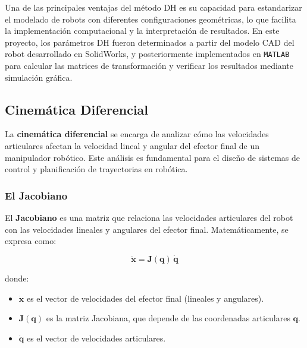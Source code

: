 Una de las principales ventajas del método DH es su capacidad para estandarizar el modelado de robots con diferentes configuraciones geométricas, lo que facilita la implementación computacional y la interpretación de resultados. En este proyecto, los parámetros DH fueron determinados a partir del modelo CAD del robot desarrollado en SolidWorks, y posteriormente implementados en \texttt{MATLAB} para calcular las matrices de transformación y verificar los resultados mediante simulación gráfica.

\subsection{Cinemática Diferencial}
La \textbf{cinemática diferencial} se encarga de analizar cómo las velocidades articulares afectan la velocidad lineal y angular del efector final de un manipulador robótico. Este análisis es fundamental para el diseño de sistemas de control y planificación de trayectorias en robótica.

\subsubsection{El Jacobiano}

El \textbf{Jacobiano} es una matriz que relaciona las velocidades articulares del robot con las velocidades lineales y angulares del efector final. Matemáticamente, se expresa como:

\[
\dot{\mathbf{x}} = \mathbf{J}(\mathbf{q}) \, \dot{\mathbf{q}}
\]

donde:
\begin{itemize}
	\item $\dot{\mathbf{x}}$ es el vector de velocidades del efector final (lineales y angulares).
	\item $\mathbf{J}(\mathbf{q})$ es la matriz Jacobiana, que depende de las coordenadas articulares $\mathbf{q}$.
	\item $\dot{\mathbf{q}}$ es el vector de velocidades articulares.
\end{itemize}

